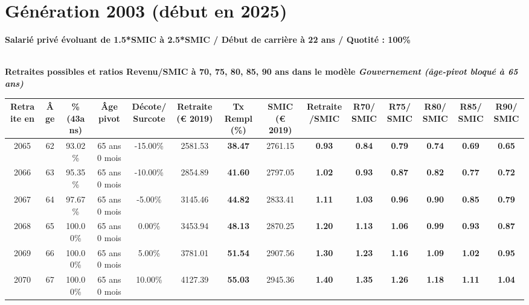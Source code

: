 \section{Génération 2003 (début en 2025)\label{Ascendant1525_100_22_2003_0}} 
 
{\bf \noindent Salarié privé évoluant de 1.5*SMIC à 2.5*SMIC / Début de carrière à 22 ans / Quotité : 100\%}  ~ 

 ~\\{\bf \noindent Retraites possibles et ratios Revenu/SMIC à 70, 75, 80, 85, 90 ans dans le modèle \emph{Gouvernement (âge-pivot bloqué à 65 ans)}}  
 
\begin{adjustbox}{max width=\textwidth} 
\begin{tabular}[htb]{|c|c||c|c|c||c|c||c|c||c|c|c|c|c|} 
\hline 
 Retraite en &  Âge &  \%(43ans) &  Âge pivot &  Décote/Surcote &  Retraite (\euro{} 2019) &  Tx Rempl(\%) &  SMIC (\euro{} 2019) &  Retraite/SMIC &  R70/SMIC &  R75/SMIC &  R80/SMIC &  R85/SMIC &  R90/SMIC \\ 
\hline \hline 
 2065 &  62 &  93.02\% &  65 ans 0 mois &  -15.00\% &  2581.53 &  {\bf 38.47} &  2761.15 &  {\bf {\color{red} 0.93}} &  {\bf {\color{red} 0.84}} &  {\bf {\color{red} 0.79}} &  {\bf {\color{red} 0.74}} &  {\bf {\color{red} 0.69}} &  {\bf {\color{red} 0.65}} \\ 
\hline 
 2066 &  63 &  95.35\% &  65 ans 0 mois &  -10.00\% &  2854.89 &  {\bf 41.60} &  2797.05 &  {\bf 1.02} &  {\bf {\color{red} 0.93}} &  {\bf {\color{red} 0.87}} &  {\bf {\color{red} 0.82}} &  {\bf {\color{red} 0.77}} &  {\bf {\color{red} 0.72}} \\ 
\hline 
 2067 &  64 &  97.67\% &  65 ans 0 mois &  -5.00\% &  3145.46 &  {\bf 44.82} &  2833.41 &  {\bf 1.11} &  {\bf 1.03} &  {\bf {\color{red} 0.96}} &  {\bf {\color{red} 0.90}} &  {\bf {\color{red} 0.85}} &  {\bf {\color{red} 0.79}} \\ 
\hline 
 2068 &  65 &  100.00\% &  65 ans 0 mois &  0.00\% &  3453.94 &  {\bf 48.13} &  2870.25 &  {\bf 1.20} &  {\bf 1.13} &  {\bf 1.06} &  {\bf {\color{red} 0.99}} &  {\bf {\color{red} 0.93}} &  {\bf {\color{red} 0.87}} \\ 
\hline 
 2069 &  66 &  100.00\% &  65 ans 0 mois &  5.00\% &  3781.01 &  {\bf 51.54} &  2907.56 &  {\bf 1.30} &  {\bf 1.23} &  {\bf 1.16} &  {\bf 1.09} &  {\bf 1.02} &  {\bf {\color{red} 0.95}} \\ 
\hline 
 2070 &  67 &  100.00\% &  65 ans 0 mois &  10.00\% &  4127.39 &  {\bf 55.03} &  2945.36 &  {\bf 1.40} &  {\bf 1.35} &  {\bf 1.26} &  {\bf 1.18} &  {\bf 1.11} &  {\bf 1.04} \\ 
\hline 
\hline 
\end{tabular} 
\end{adjustbox} 
 
